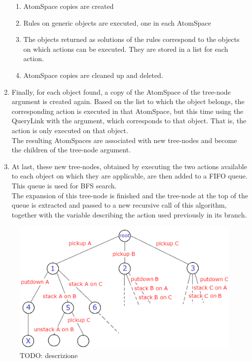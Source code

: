 \begin{enumerate}
	\begin{enumerate}
		\item AtomSpace copies are created
		\item Rules on generic objects are executed, one in each AtomSpace
		\item The objects returned as solutions of the rules correspond to the objects on which actions can be executed. They are stored in a list for each action.
		\item AtomSpace copies are cleaned up and deleted.
	\end{enumerate}

	\item Finally, for each object found, a copy of the AtomSpace of the tree-node argument is created again. Based on the list to which the object belongs, the corresponding action is executed in that AtomSpace, but this time using the QueryLink with the argument, which corresponds to that object. That is, the action is only executed on that object. \\
The resulting AtomSpaces are associated with new tree-nodes and become the children of the tree-node argument.
	
	\item At last, these new tree-nodes, obtained by executing the two actions available to each object on which they are applicable, are then added to a FIFO queue.
This queue is used for BFS search. \\
The expansion of this tree-node is finished and the tree-node at the top of the queue is extracted and passed to a new recursive call of this algorithm, together with the variable describing the action used previously in its branch. 
\end{enumerate}



\begin{figure} [h]
\centering
\includegraphics[width=1.0
\textwidth]{figures/Magistrale/BFS_1_blue}
\caption[BFS Example]{ TODO: descrizione
\label{fig:BFS_1}}
\end{figure} 

